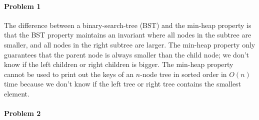 \documentclass[11pt]{article}
\begin{document}
\MakeScribeTop


\paragraph{\noindent\textbf{\LARGE{Problem 1}}}


\begin{flushleft}
    The difference between a binary-search-tree (BST) and the min-heap property is that the BST property maintains
    an invariant where all nodes in the subtree are smaller, and all nodes in the right subtree are larger. The min-heap property only guarantees
    that the parent node is always smaller than the child node; we don't know if the left children or right children is bigger. 
    \newline
    \newline
    The min-heap property cannot be used to print out the keys of an $n$-node tree in sorted order in $O(n)$ time because we don't know
    if the left tree or right tree contains the smallest element. 
\end{flushleft}   

\paragraph{\noindent\textbf{\LARGE{Problem 2}}}
\end{document}
